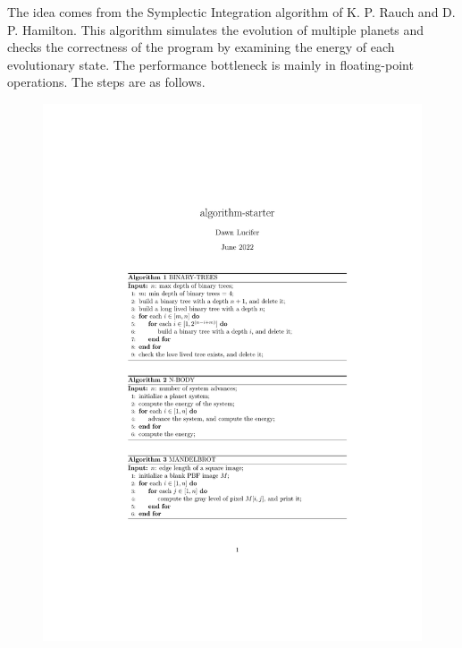 The idea comes from the Symplectic Integration algorithm of K. P. Rauch
and D. P. Hamilton.
This algorithm simulates the evolution of multiple planets and checks the correctness of the program by examining the energy of each evolutionary state. The performance bottleneck is mainly in floating-point operations. The steps are as follows.

\begin{figure}[htbp]
    \centerline{\includegraphics[scale=0.8]{figures/n-body}}
    \label{fig:n-body}
\end{figure}

